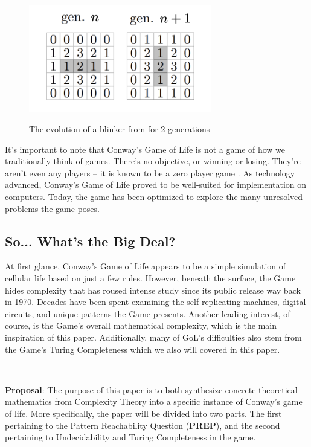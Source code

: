 \documentclass{article}
\theoremstyle{definition}
\theoremstyle{plain}
\theoremstyle{plain}
\begin{document}
 \begin{figure}[ht]
          \centering
    \includegraphics[width=8cm]{figures/figure_one.png}
    \caption{The evolution of a blinker from for 2 generations}
    \label{figure_one}
    \cite{Bontes2019}
\end{figure}

It’s important to note that Conway’s Game of Life is not a game of how we traditionally think of games. There’s no objective, or winning or losing. They’re aren’t even any players – it is known to be a zero player game \cite{Beginning_Life_2006}. As technology advanced, Conway’s Game of Life proved to be well-suited for implementation on computers. Today, the game has been optimized to explore the many unresolved problems the game poses. 

\subsection{So... What's the Big Deal?}

At first glance, Conway’s Game of Life appears to be a simple simulation of cellular life based on just a few rules. However, beneath the surface, the Game hides complexity that has roused intense study since its public release way back in 1970. Decades have been spent examining the self-replicating machines, digital circuits, and unique patterns the Game presents. Another leading interest, of course, is the Game's overall mathematical complexity, which is the main inspiration of this paper. Additionally, many of GoL's difficulties also stem from the Game's Turing Completeness which we also will covered in this paper. 

\ 

\textbf{Proposal}: The purpose of this paper is to both synthesize concrete theoretical mathematics from Complexity Theory into a specific instance of Conway's game of life. More specifically, the paper will be divided into two parts. The first pertaining to the Pattern Reachability Question (\textbf{PREP}), and the second pertaining to Undecidability and Turing Completeness in the game.
\end{document}
